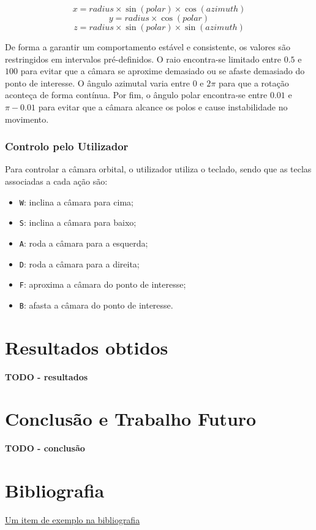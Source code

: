 \documentclass[12pt, a4paper]{article}
\begin{document}
$$x = radius \times \sin(polar) \times \cos(azimuth)$$
$$y = radius \times \cos(polar)$$
$$z = radius \times \sin(polar) \times \sin(azimuth)$$

De forma a garantir um comportamento estável e consistente, os valores são restringidos em
intervalos pré-definidos. O raio encontra-se limitado entre $0.5$ e $100$ para evitar que a câmara
se aproxime demasiado ou se afaste demasiado do ponto de interesse. O ângulo azimutal varia entre
$0$ e $2\pi$ para que a rotação aconteça de forma contínua. Por fim, o ângulo polar encontra-se
entre $0.01$ e $\pi - 0.01$ para evitar que a câmara alcance os polos e cause instabilidade no
movimento.

\subsubsection{Controlo pelo Utilizador}

Para controlar a câmara orbital, o utilizador utiliza o teclado, sendo que as teclas associadas a
cada ação são:
\begin{itemize}
    \item \texttt{W}: inclina a câmara para cima;
    \item \texttt{S}: inclina a câmara para baixo;
    \item \texttt{A}: roda a câmara para a esquerda;
    \item \texttt{D}: roda a câmara para a direita;
    \item \texttt{F}: aproxima a câmara do ponto de interesse;
    \item \texttt{B}: afasta a câmara do ponto de interesse.
\end{itemize}

\section{Resultados obtidos}

\textbf{\color{red} TODO - resultados}

\section{Conclusão e Trabalho Futuro}

\textbf{\color{red} TODO - conclusão}

\begingroup
\section{Bibliografia}
\renewcommand{\section}[2]{}

\begin{thebibliography}{9}
        \href{https://youtu.be/dQw4w9WgXcQ}{Um item de exemplo na bibliografia}
\end{thebibliography}
\endgroup
\end{document}
